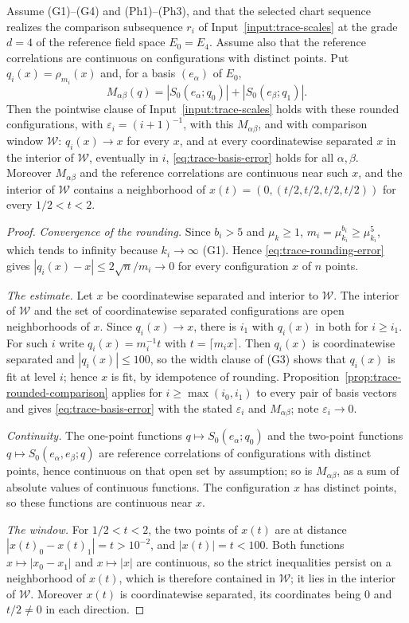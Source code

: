 \begin{corollary}
\label{cor:trace-rounded-input}
Assume (G1)--(G4) and (Ph1)--(Ph3), and that the selected chart
sequence realizes the comparison subsequence $r_i$ of
Input~\ref{input:trace-scales} at the grade $d=4$ of the reference
field space $E_0=E_4$. Assume also that the reference correlations are
continuous on configurations with distinct points. Put
$q_i(x)=\rho_{m_i}(x)$ and, for a basis $(e_\alpha)$ of $E_0$,
\[
 M_{\alpha\beta}(q)=|S_0(e_\alpha;q_0)|+|S_0(e_\beta;q_1)| .
\]
Then the pointwise clause of Input~\ref{input:trace-scales} holds with
these rounded configurations, with $\varepsilon_i=(i+1)^{-1}$, with this
$M_{\alpha\beta}$, and with comparison window $\mathcal W$: $q_i(x)\to x$
for every $x$, and at every coordinatewise separated $x$ in the interior
of $\mathcal W$, eventually in $i$, \eqref{eq:trace-basis-error} holds for
all $\alpha,\beta$. Moreover $M_{\alpha\beta}$ and the reference
correlations are continuous near such $x$, and the interior of
$\mathcal W$ contains a neighborhood of
$x(t)=(0,(t/2,t/2,t/2,t/2))$ for every $1/2<t<2$.
\end{corollary}
\begin{proof}
\emph{Convergence of the rounding.} Since $b_i>5$ and $\mu_k\ge1$,
$m_i=\mu_{k_i}^{b_i}\ge\mu_{k_i}^5$, which tends to infinity because
$k_i\to\infty$ (G1). Hence \eqref{eq:trace-rounding-error} gives
$|q_i(x)-x|\le2\sqrt n/m_i\to0$ for every configuration $x$ of $n$ points.

\emph{The estimate.} Let $x$ be coordinatewise separated and interior to
$\mathcal W$. The interior of $\mathcal W$ and the set of coordinatewise
separated configurations are open neighborhoods of $x$. Since
$q_i(x)\to x$, there is $i_1$ with $q_i(x)$ in both for $i\ge i_1$. For
such $i$ write $q_i(x)=m_i^{-1}t$ with $t=\lceil m_ix\rceil$. Then
$q_i(x)$ is coordinatewise separated and $|q_i(x)|\le100$, so the width
clause of (G3) shows that $q_i(x)$ is fit at level $i$; hence $x$ is fit,
by idempotence of rounding. Proposition~\ref{prop:trace-rounded-comparison}
applies for $i\ge\max(i_0,i_1)$ to every pair of basis vectors and gives
\eqref{eq:trace-basis-error} with the stated $\varepsilon_i$ and
$M_{\alpha\beta}$; note $\varepsilon_i\to0$.

\emph{Continuity.} The one-point functions $q\mapsto S_0(e_\alpha;q_0)$
and the two-point functions $q\mapsto S_0(e_\alpha,e_\beta;q)$ are
reference correlations of configurations with distinct points, hence
continuous on that open set by assumption; so is $M_{\alpha\beta}$, as a
sum of absolute values of continuous functions. The configuration $x$ has
distinct points, so these functions are continuous near $x$.

\emph{The window.} For $1/2<t<2$, the two points of $x(t)$ are at
distance $|x(t)_0-x(t)_1|=t>10^{-2}$, and $|x(t)|=t<100$. Both functions
$x\mapsto|x_0-x_1|$ and $x\mapsto|x|$ are continuous, so the strict
inequalities persist on a neighborhood of $x(t)$, which is therefore
contained in $\mathcal W$; it lies in the interior of $\mathcal W$.
Moreover $x(t)$ is coordinatewise separated, its coordinates being $0$
and $t/2\ne0$ in each direction.
\end{proof}

